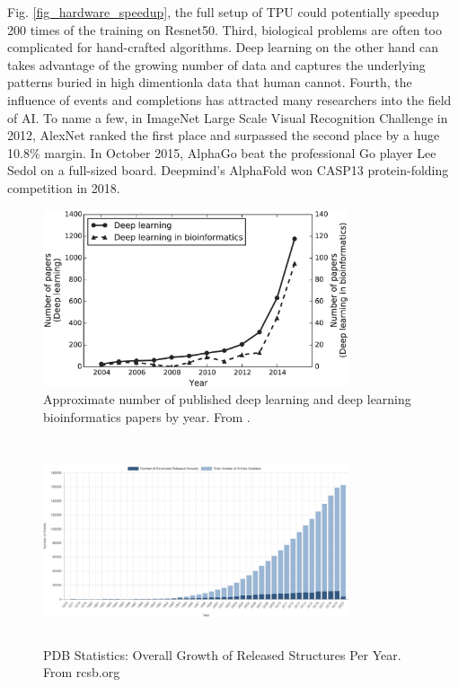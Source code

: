 Fig. \ref{fig_hardware_speedup}, the full setup of TPU could potentially speedup 200 times of the training on Resnet50. Third, biological problems are often too complicated for hand-crafted algorithms. Deep learning on the other hand can takes advantage of the growing number of data and captures the underlying patterns buried in high dimentionla data that human cannot.  Fourth, the influence of events and completions has attracted many researchers into the field of AI. To name a few, in ImageNet Large Scale Visual Recognition Challenge in 2012, AlexNet \cite{krizhevsky2012imagenet} ranked the first place and surpassed the second place by a huge 10.8\% margin. In October 2015, AlphaGo \cite{silver2017mastering} beat the professional Go player Lee Sedol on a full-sized board. Deepmind’s AlphaFold \cite{senior2020improved} won CASP13 protein-folding competition in 2018. 
\begin{figure}[h!]
\begin{center}
\includegraphics[width = 9cm]{img/deepLearning_in_bioinfo.png}
\caption[Approximate number of published deep learning and deep learning bioinformatics papers by year]{Approximate number of published deep learning and deep learning bioinformatics papers by year. From \cite{min2017deep}.  \label{fig_deelLearning_papers}}
\end{center}
\end{figure}

\begin{figure}[!h]
\begin{center}
\includegraphics[height = 6cm, width = 9cm]{img/pdb_stats.png}
\caption[PDB Statistics: Overall Growth of Released Structures Per Year]{PDB Statistics: Overall Growth of Released Structures Per Year. From rcsb.org \cite{berman2002protein} \label{fig_pdb_stats}}
\end{center}
\end{figure}

